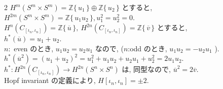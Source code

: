 \documentclass[10pt, leqno]{ltjsarticle} %
\newcommand{\gen}[1]{\{\,#1\,\}}       %
\newcommand{\z}{\mathbb{Z}}
\numberwithin{equation}{section}
\theoremstyle{plain}
\theoremstyle{definition}
\theoremstyle{remark}
\begin{document}
\begin{paracol}{2}
\noindent
\(H^m(S^m\times S^m) = \z\gen{u_1}\oplus\z\gen{u_2}\)
とすると,
\(H^{2m}(S^m\times S^m) = \z\gen{u_1 u_2},
u_1^2 = u_2^2 = 0 .\)\\
\(H^n(C_{[\iota_n, \iota_n]}) = \z\gen{\overline{u}},\
H^{2n}(C_{[\iota_n, \iota_n]}) = \z\gen{\overline{v}}\)
とすると, \\
\(h^*(\overline{u}) = u_1 + u_2.\)\\
\(n:\) even のとき, \(u_1 u_2 = u_2 u_1\) なので,
(\(n\):odd のとき, \(u_1 u_2 = - u_2 u_1\) ).\\
\(h^*(\overline{u}^2) = (u_1 + u_2)^2
= u_1^2 + u_1 u_2 + u_2 u_1 + u_2^2 = 2u_1 u_2.\)\\
\(h^*:H^{2n}(C_{[\iota_n, \iota_n]})\to H^{2n}(S^n\times S^n)\)
は, 同型なので,
\(\overline{u}^2 = 2\overline{v}\).\\
Hopf invariant の定義により, 
\(H[\iota_n, \iota_n] = \pm2.\)


\end{paracol}
\end{document}
